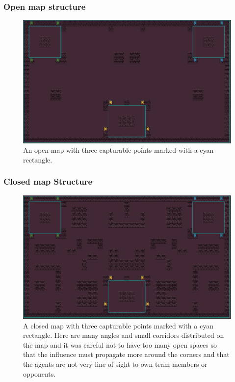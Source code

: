 \documentclass[]{report}
\begin{document}
		\subsubsection{Open map structure}
			\begin{figure}[h!]
			\centering
			\includegraphics[width=1\linewidth]{"Images/open map"}
			\caption[Open map structure]{An open map with three capturable points marked with a cyan rectangle.}
			\label{fig:open-map}
			\end{figure}
		
		\clearpage
		\subsubsection{Closed map Structure}
		\begin{figure}[h!]
			\centering
			\includegraphics[width=1\linewidth]{Images/closemap}
			\caption[Close map structure]{A closed map with three capturable points marked with a cyan rectangle. Here are many angles and small corridors distributed on the map and it was careful not to have too many open spaces so that the influence must propagate more around the corners and that the agents are not very line of sight to own team members or opponents.}
			\label{fig:close-map}
		\end{figure}
		
\end{document}
